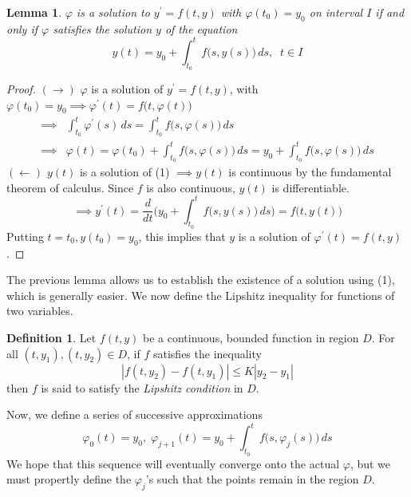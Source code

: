 \documentclass{article}
\newtheorem{lemma}[theorem]{Lemma}
\theoremstyle{remark}
\theoremstyle{definition}
\newtheorem{definition}{Definition}[section]
\begin{document}
    \begin{lemma}
    $\varphi$ is a solution to $y^\prime = f(t, y)$ with $\varphi(t_0) = y_0$ on interval $I$ if and only if $\varphi$ satisfies the solution $y$ of the equation
    \begin{equation}
        y(t) = y_0 + \int_{t_0}^t f\big( s, y(s)\big) \,ds, \;\; t \in I
    \end{equation}
    \end{lemma}
    \begin{proof}
    $(\rightarrow)$ $\varphi$ is a solution of $y^\prime = f(t, y)$, with $\varphi(t_0) = y_0 \implies \varphi^\prime (t) = f \big(t, \varphi(t) \big)$
    \begin{align*}
        \implies & \int_{t_0}^t \varphi^\prime (s) \,ds = \int_{t_0}^t f \big( s, \varphi(s) \big) \, ds \\
        \implies & \varphi(t) = \varphi(t_0) + \int_{t_0}^t f\big(s, \varphi(s)\big) \,ds = y_0 + \int_{t_0}^t f \big( s, \varphi(s) \big) \,ds
    \end{align*}
    $(\leftarrow)$ $y(t)$ is a solution of (1) $\implies y(t)$ is continuous by the fundamental theorem of calculus. Since $f$ is also continuous, $y(t)$ is differentiable. 
    \[\implies y^\prime (t) = \frac{d}{dt} \bigg( y_0 + \int_{t_0}^t f\big( s, y(s) \big) \, ds \bigg) = f\big(t, y(t) \big)\]
    Putting $t=t_0, y (t_0) = y_0$, this implies that $y$ is a solution of $\varphi^\prime (t) = f(t, y)$. 
    \end{proof}

    The previous lemma allows us to establish the existence of a solution using (1), which is generally easier. We now define the Lipshitz inequality for functions of two variables. 

    \begin{definition}
    Let $f(t, y)$ be a continuous, bounded function in region $D$. For all $(t, y_1), (t, y_2) \in D$, if $f$ satisfies the inequality 
    \[|f(t, y_2) - f(t, y_1)| \leq K |y_2 - y_1|\]
    then $f$ is said to satisfy the \textit{Lipshitz condition} in $D$.
    \end{definition}

    Now, we define a series of successive approximations
    \[\varphi_0 (t) = y_0, \; \varphi_{j+1} (t) = y_0 + \int_{t_0}^t f\big(s, \varphi_j (s) \big) \, ds\]
    We hope that this sequence will eventually converge onto the actual $\varphi$, but we must propertly define the $\varphi_j$'s such that the points remain in the region $D$. 
\end{document}
